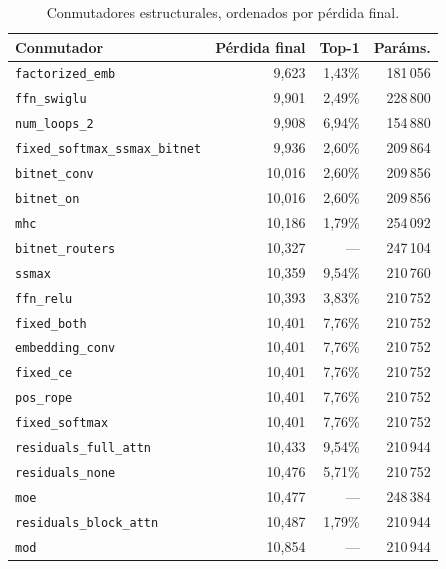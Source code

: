 \begin{table}[H]
\centering
\small
\caption{Conmutadores estructurales, ordenados por pérdida final.}
\label{tab:r2-trans}
\begin{tabular}{lrrr}
\toprule
Conmutador & Pérdida final & Top-1 & Paráms. \\
\midrule
\texttt{factorized\_emb}              & 9,623  & 1,43\% & 181\,056 \\
\texttt{ffn\_swiglu}                  & 9,901  & 2,49\% & 228\,800 \\
\texttt{num\_loops\_2}                & 9,908  & 6,94\% & 154\,880 \\
\texttt{fixed\_softmax\_ssmax\_bitnet} & 9,936 & 2,60\% & 209\,864 \\
\texttt{bitnet\_conv}                 & 10,016 & 2,60\% & 209\,856 \\
\texttt{bitnet\_on}                   & 10,016 & 2,60\% & 209\,856 \\
\texttt{mhc}                          & 10,186 & 1,79\% & 254\,092 \\
\texttt{bitnet\_routers}              & 10,327 & ---    & 247\,104 \\
\texttt{ssmax}                        & 10,359 & 9,54\% & 210\,760 \\
\texttt{ffn\_relu}                    & 10,393 & 3,83\% & 210\,752 \\
\texttt{fixed\_both}                  & 10,401 & 7,76\% & 210\,752 \\
\texttt{embedding\_conv}              & 10,401 & 7,76\% & 210\,752 \\
\texttt{fixed\_ce}                    & 10,401 & 7,76\% & 210\,752 \\
\texttt{pos\_rope}                    & 10,401 & 7,76\% & 210\,752 \\
\texttt{fixed\_softmax}               & 10,401 & 7,76\% & 210\,752 \\
\texttt{residuals\_full\_attn}        & 10,433 & 9,54\% & 210\,944 \\
\texttt{residuals\_none}              & 10,476 & 5,71\% & 210\,752 \\
\texttt{moe}                          & 10,477 & ---    & 248\,384 \\
\texttt{residuals\_block\_attn}       & 10,487 & 1,79\% & 210\,944 \\
\texttt{mod}                          & 10,854 & --- & 210\,944 \\
\bottomrule
\end{tabular}
\end{table}

